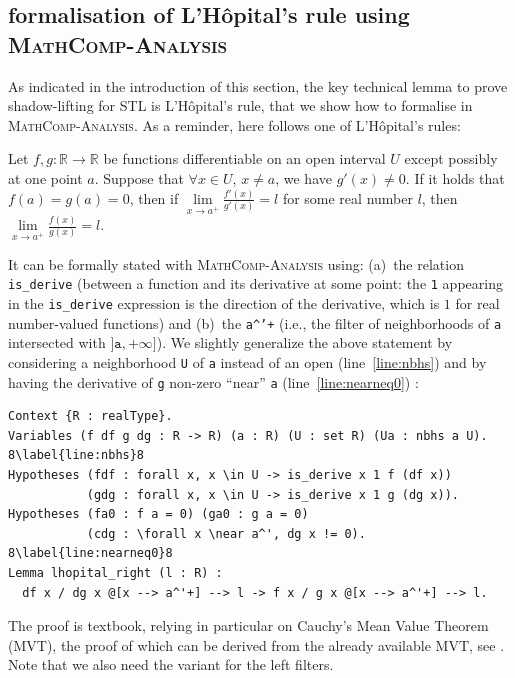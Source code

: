 \documentclass[a4paper,UKenglish,cleveref, autoref, thm-restate]{lipics-v2021}
\def\coqin#1{\texttt{#1}}
\newcommand{\Real}{{\mathbb R}}
\def\STL{\textrm{STL}}
\def\analysis{\textsc{MathComp-Analysis}}
\begin{document}
\subsection{formalisation of L'H\^opital's rule using \analysis{}}
\label{sec:lhopital}

As indicated in the introduction of this section, the key technical
lemma to prove shadow-lifting for \STL{} is L'H\^opital's rule, that
we show how to formalise in \analysis{}. As a reminder, here follows
one of L'H\^opital's rules:
\begin{theorem}
Let $f, g: \Real \to \Real$ be functions differentiable on an open interval $U$ 
except possibly at one point $a$. Suppose that $\forall x \in U$, $x\neq a$, we have
$g'(x) \neq 0$. If it holds that $f(a)=g(a)=0$, then
if $\lim\limits_{x \rightarrow a^+} \frac{f'(x)}{g'(x)} = l$ for some real number $l$,
then $\lim\limits_{x \rightarrow a^+} \frac{f(x)}{g(x)} = l$.
\end{theorem}
It can be formally stated with \analysis{} using: (a)~the relation
\coqin{is_derive} (between a function and its derivative at some
point: the \coqin{1} appearing in the \coqin{is_derive} expression is
the direction of the derivative, which is $1$ for real number-valued
functions) and (b)~the  \coqin{a^'+} (i.e., the
filter of neighborhoods of \coqin{a} intersected with
$]\texttt{a},+\infty]$). We slightly generalize the above statement by
considering a neighborhood \coqin{U} of \coqin{a} instead of an open (line~\ref{line:nbhs})
and by having the derivative of \coqin{g} non-zero ``near'' \coqin{a} (line~\ref{line:nearneq0})
\cite[Sect.~3.2]{affeldt2018formalization}:
\begin{verbatim}
Context {R : realType}.
Variables (f df g dg : R -> R) (a : R) (U : set R) (Ua : nbhs a U). 8\label{line:nbhs}8
Hypotheses (fdf : forall x, x \in U -> is_derive x 1 f (df x))
           (gdg : forall x, x \in U -> is_derive x 1 g (dg x)).
Hypotheses (fa0 : f a = 0) (ga0 : g a = 0)
           (cdg : \forall x \near a^', dg x != 0). 8\label{line:nearneq0}8
Lemma lhopital_right (l : R) :
  df x / dg x @[x --> a^'+] --> l -> f x / g x @[x --> a^'+] --> l.
\end{verbatim}
The proof is textbook, relying in particular on Cauchy's Mean
  Value Theorem (MVT), the proof of which can be derived from the
already available MVT, see \cite[file \coqin{stl.v}]{ldl}.
%
Note that we also need the variant for the left filters.
\end{document}
